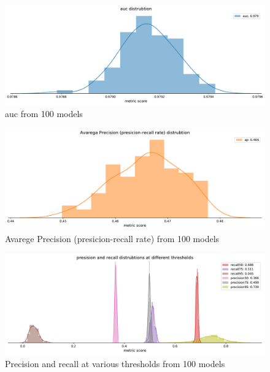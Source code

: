 \documentclass[a4paper]{article}
\begin{document}
\begin{figure}[!htb]
	\centering
	\includegraphics[scale=0.4]{auc_out_20.pdf}
    \caption{\footnotesize{auc from 100 models}}%
\end{figure}



\begin{figure}[!htb]
	\centering
	\includegraphics[scale=0.4]{ap_out_20.pdf}
    \caption{\footnotesize{Avarege Precision (presicion-recall rate) from 100 models}}%
\end{figure}


\begin{figure}[!htb]
	\centering
	\includegraphics[scale=0.4]{recall_prec_out_20.pdf}
    \caption{\footnotesize{Precision and recall at various thresholds from 100 models}}%
\end{figure}
\end{document}
